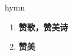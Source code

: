 
\begin{frame}
{\huge hymn}
\begin{center}
\begin{enumerate}\Large
  \item \textbf{赞歌，赞美诗}
  \item \textbf{赞美}
\end{enumerate}
\end{center}
\end{frame}
